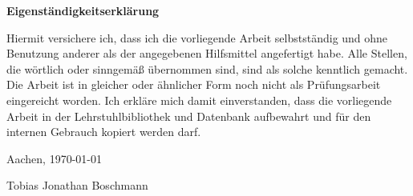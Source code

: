 \Large
\textbf{Eigenständigkeitserklärung}

\begin{normalsize}
Hiermit versichere ich, dass ich die vorliegende Arbeit selbstständig und ohne Benutzung anderer als der angegebenen Hilfsmittel angefertigt habe. Alle Stellen, die wörtlich oder sinngemäß übernommen sind, sind als solche kenntlich gemacht. Die Arbeit ist in gleicher oder ähnlicher Form noch nicht als Prüfungsarbeit eingereicht worden. Ich erkläre mich damit einverstanden, dass die vorliegende Arbeit in der Lehrstuhlbibliothek und Datenbank aufbewahrt und für den internen Gebrauch kopiert werden darf. \newline \newline


Aachen, \today \newline \newline

Tobias Jonathan Boschmann
\end{normalsize}